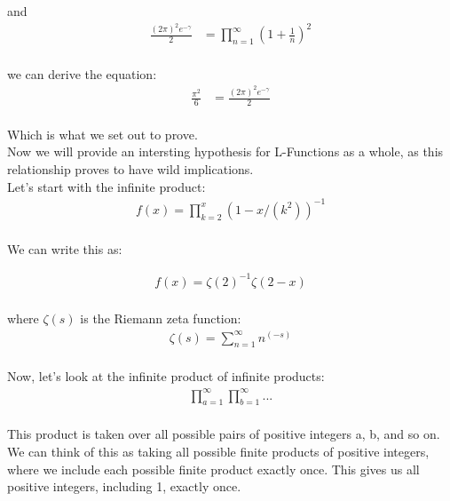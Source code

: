 \documentclass{article}
\begin{document}
and \\

\begin{align*}
\frac{(2\pi)^2 e^{-\gamma}}{2} &= \prod_{n=1}^{\infty} \left(1 + \frac{1}{n}\right)^2 \\
\end{align*}

we can derive the equation: \\

\begin{align*}
\frac{\pi^2}{6} &= \frac{(2\pi)^2 e^{-\gamma}}{2} \\
\end{align*}

Which is what we set out to prove. \\

Now we will provide an intersting hypothesis for L-Functions as a whole, as this relationship proves to have wild implications. \\

Let's start with the infinite product: \\

\begin{align*}
f(x) = \prod_{k=2}^x \left(1 - x/ \left(k^2\right)\right)^{-1} \\
\end{align*}

We can write this as:

\begin{align*}
f(x) = {\zeta\left(2\right)^{-1}}{\zeta\left(2-x\right)} \\
\end{align*}

where $\zeta(s)$ is the Riemann zeta function: \\

\begin{align*}
\zeta(s) = \sum_{n=1}^\infty n^\left(-s\right) \\
\end{align*}

Now, let's look at the infinite product of infinite products: \\

\begin{align*}
\prod_{a=1}^\infty \prod_{b=1}^\infty ... \\
\end{align*}

This product is taken over all possible pairs of positive integers a, b, and so on. We can think of this as taking all possible finite products of positive integers, where we include each possible finite product exactly once. This gives us all positive integers, including 1, exactly once. \\
\end{document}
